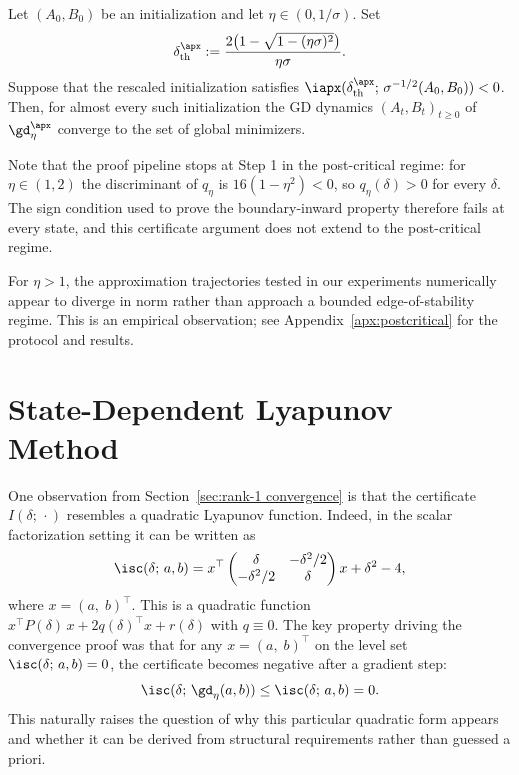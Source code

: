 \documentclass{article}
\begin{document}
\begin{theorem}\label{thm:convergence_region_rank_1_approx}
Let $(A_0,B_0)$ be an initialization and let $\eta \in (0, 1/\sigma)$. Set
\begin{align}
    \delta_\mathrm{th}^\apx
    := \frac{2\bigl(1 - \sqrt{1 - (\eta\sigma)^2}\bigr)}{\eta\sigma}.
\end{align}
Suppose that the rescaled initialization satisfies
$\iapx(\delta_\mathrm{th}^\apx;\,\sigma^{-1/2}(A_0,B_0)) < 0$. Then, for
almost every such initialization the GD dynamics $(A_t,B_t)_{t\ge0}$ of
$\gd_\eta^\apx$ converge to the set of global minimizers.
\end{theorem}

Note that the proof pipeline stops at Step 1 in
the post-critical regime: for $\eta\in(1,2)$ the discriminant of $q_\eta$ is
$16(1-\eta^2)<0$, so $q_\eta(\delta)>0$ for every $\delta$. The sign condition
used to prove the boundary-inward property therefore fails at every state, and this certificate argument does not extend to the post-critical regime.

\begin{remark}
\label{rmk:no_edge_of_stability_apx}
For $\eta>1$, the approximation trajectories tested in our experiments
numerically appear to diverge in norm rather than approach a bounded
edge-of-stability regime. This is an empirical observation; see
Appendix~\ref{apx:postcritical} for the protocol and results.
\end{remark}

\section{State-Dependent Lyapunov Method}\label{sec:state_dependent_lyapunov}

One observation from Section~\ref{sec:rank-1 convergence} is that the certificate
$I(\delta;\,\cdot)$ resembles a quadratic Lyapunov function. Indeed, in the scalar
factorization setting it can be written as
\begin{align}
    \isc(\delta;\, a, b)
    = x^\top
      \begin{pmatrix} \delta & -\delta^2/2 \\ -\delta^2/2 & \delta \end{pmatrix}
      x + \delta^2 - 4,
\end{align}
where $x = (a, \; b)^\top$. This is a quadratic function
$x^\top P(\delta)\,x +2 q(\delta)^\top x + r(\delta)$ with $q\equiv 0$.
The key property driving the convergence proof was that for
any $x = (a, \; b)^\top$ on the level set $\isc(\delta;\, a, b) = 0$, the
certificate becomes negative after a gradient step:
\begin{align}
    \isc(\delta;\, \gd_\eta(a, b)) \le \isc(\delta;\, a, b) = 0.
\end{align}
This naturally raises the question of why this particular quadratic form appears and
whether it can be derived from structural requirements rather than guessed a priori.
\end{document}
